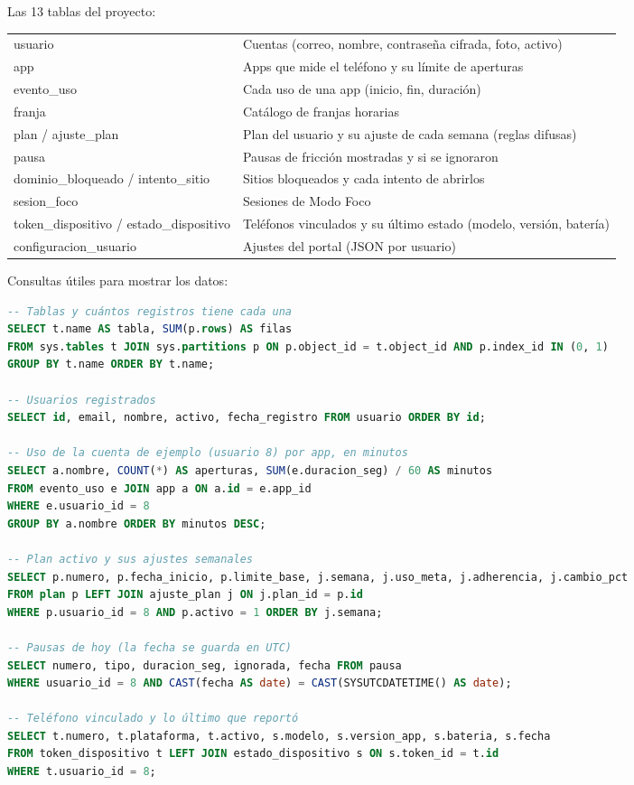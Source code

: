 \documentclass[11pt,a4paper]{article}
\begin{document}
\noindent Las 13 tablas del proyecto:
\begin{center}
\small
\begin{tabularx}{\textwidth}{>{\ttfamily}l X}
\toprule
usuario & Cuentas (correo, nombre, contraseña cifrada, foto, activo) \\
app & Apps que mide el teléfono y su límite de aperturas \\
evento\_uso & Cada uso de una app (inicio, fin, duración) \\
franja & Catálogo de franjas horarias \\
plan / ajuste\_plan & Plan del usuario y su ajuste de cada semana (reglas difusas) \\
pausa & Pausas de fricción mostradas y si se ignoraron \\
dominio\_bloqueado / intento\_sitio & Sitios bloqueados y cada intento de abrirlos \\
sesion\_foco & Sesiones de Modo Foco \\
token\_dispositivo / estado\_dispositivo & Teléfonos vinculados y su último estado (modelo, versión, batería) \\
configuracion\_usuario & Ajustes del portal (JSON por usuario) \\
\bottomrule
\end{tabularx}
\end{center}

\noindent Consultas útiles para mostrar los datos:
\begin{lstlisting}[language=SQL]
-- Tablas y cuántos registros tiene cada una
SELECT t.name AS tabla, SUM(p.rows) AS filas
FROM sys.tables t JOIN sys.partitions p ON p.object_id = t.object_id AND p.index_id IN (0, 1)
GROUP BY t.name ORDER BY t.name;

-- Usuarios registrados
SELECT id, email, nombre, activo, fecha_registro FROM usuario ORDER BY id;

-- Uso de la cuenta de ejemplo (usuario 8) por app, en minutos
SELECT a.nombre, COUNT(*) AS aperturas, SUM(e.duracion_seg) / 60 AS minutos
FROM evento_uso e JOIN app a ON a.id = e.app_id
WHERE e.usuario_id = 8
GROUP BY a.nombre ORDER BY minutos DESC;

-- Plan activo y sus ajustes semanales
SELECT p.numero, p.fecha_inicio, p.limite_base, j.semana, j.uso_meta, j.adherencia, j.cambio_pct
FROM plan p LEFT JOIN ajuste_plan j ON j.plan_id = p.id
WHERE p.usuario_id = 8 AND p.activo = 1 ORDER BY j.semana;

-- Pausas de hoy (la fecha se guarda en UTC)
SELECT numero, tipo, duracion_seg, ignorada, fecha FROM pausa
WHERE usuario_id = 8 AND CAST(fecha AS date) = CAST(SYSUTCDATETIME() AS date);

-- Teléfono vinculado y lo último que reportó
SELECT t.numero, t.plataforma, t.activo, s.modelo, s.version_app, s.bateria, s.fecha
FROM token_dispositivo t LEFT JOIN estado_dispositivo s ON s.token_id = t.id
WHERE t.usuario_id = 8;
\end{lstlisting}
\end{document}
